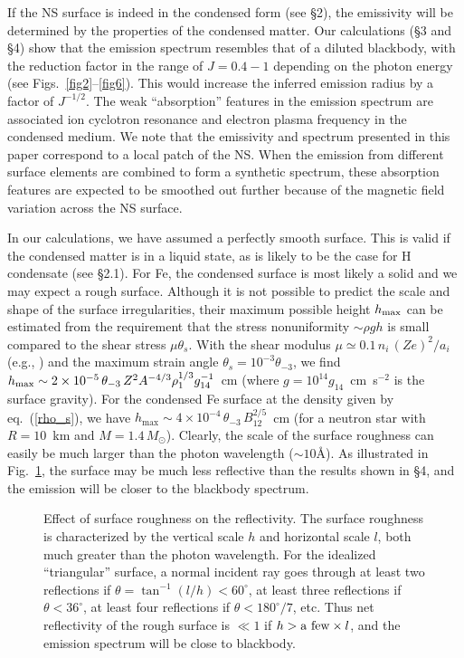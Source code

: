 \documentclass{emulateapj}
\begin{document}
If the NS surface is indeed in the condensed form (see \S2), the
emissivity will be determined by the properties of the condensed
matter. Our calculations (\S 3 and \S 4) show that the emission 
spectrum resembles that of a diluted blackbody, with the reduction
factor in the range of $J=0.4-1$ depending on the photon energy
(see Figs.\ \ref{fig2}--\ref{fig6}). 
This would increase the inferred emission radius by
a factor of $J^{-1/2}$. The weak ``absorption'' features in the emission
spectrum are associated ion cyclotron resonance and electron plasma frequency
in the condensed medium. We note that the emissivity and spectrum
presented in this paper correspond to a local patch of the NS.
When the emission from different surface elements are combined to form 
a synthetic spectrum, these absorption features are expected to be smoothed 
out further because of the magnetic field variation across the NS surface.

In our calculations, we have assumed a perfectly smooth surface.
This is valid if the condensed matter is in a liquid state, as is likely
to be the case for H condensate (see \S 2.1). For Fe, the condensed
surface is most likely a solid and we may expect a rough surface.
Although it is not possible to predict the scale and shape of the surface
irregularities, their maximum possible height $h_{\rm max}$ can be
estimated from the requirement that the stress nonuniformity
$\sim\rho g h$ is small compared to the shear stress
$\mu\theta_s$. With the shear modulus $\mu\simeq 0.1\,n_i\,(Ze)^2/a_i$
(e.g., \citet{OgataIchimaru}) and the maximum strain angle $\theta_s
=10^{-3}\theta_{-3}$, we find 
$h_{\rm max}\sim 2\times 10^{-5}\,\theta_{-3}\,
Z^2 A^{-4/3}\rho_1^{1/3}g_{14}^{-1}$~cm
(where $g=10^{14}g_{14}$~cm~s$^{-2}$ is the surface gravity).
For the condensed Fe surface at the density given by 
eq.~(\ref{rho_s}), we have $h_\mathrm{max}\sim
4\times 10^{-4}\,\theta_{-3}\, B_{12}^{2/5}$~cm (for a neutron star with $R=10$~km
and $M=1.4\,M_\odot$).
Clearly, the scale of the surface roughness can easily be much larger 
than the photon wavelength ($\sim 10$\AA). As illustrated in Fig.~\ref{fig11},
the surface may be much less reflective than 
the results shown in \S 4, and the emission will be closer to the blackbody
spectrum.

\begin{figure}
\caption{Effect of surface roughness on the reflectivity.
The surface roughness is characterized by the vertical scale $h$ and
horizontal scale $l$, both much greater than the photon wavelength.
For the idealized ``triangular'' surface, 
a normal incident ray goes through at least two reflections if
$\theta=\tan^{-1}(l/h)<60^\circ$, at least three reflections if
$\theta<36^\circ$, at least four reflections if
$\theta<180^\circ/7$, etc. Thus net reflectivity of the rough surface
is $\ll 1$ if $h>{\rm a~few}\times l$, and the emission spectrum 
will be close to blackbody.}
\label{fig11}
\end{figure}
\end{document}
